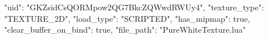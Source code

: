 {
    "uid": "GKZsidCsQORMpow2QG7BkcZQWwdRWUy4",
    "texture_type": "TEXTURE_2D",
    "load_type": "SCRIPTED",
    "has_mipmap": true,
    "clear_buffer_on_bind": true,
    "file_path": "PureWhiteTexture.lua"
}